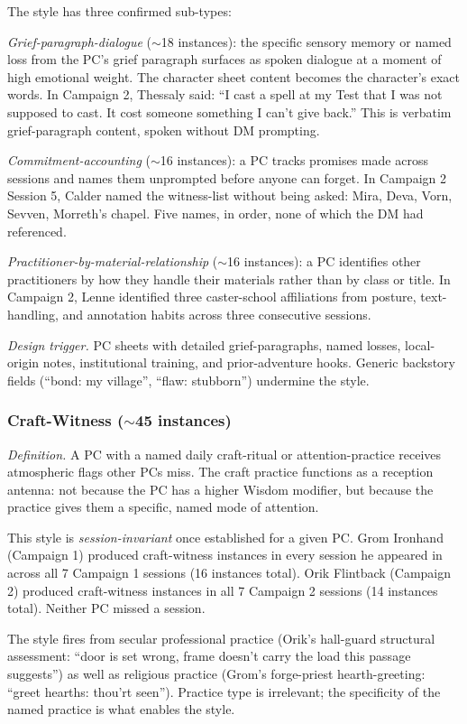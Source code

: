 The style has three confirmed sub-types:

\textit{Grief-paragraph-dialogue} ($\sim$18 instances): the specific sensory memory or
named loss from the PC's grief paragraph surfaces as spoken dialogue at a moment of
high emotional weight. The character sheet content becomes the character's exact words.
In Campaign 2, Thessaly said: ``I cast a spell at my Test that I was not supposed to
cast. It cost someone something I can't give back.'' This is verbatim grief-paragraph
content, spoken without DM prompting.

\textit{Commitment-accounting} ($\sim$16 instances): a PC tracks promises made across
sessions and names them unprompted before anyone can forget. In Campaign 2 Session 5,
Calder named the witness-list without being asked: Mira, Deva, Vorn, Sevven, Morreth's
chapel. Five names, in order, none of which the DM had referenced.

\textit{Practitioner-by-material-relationship} ($\sim$16 instances): a PC identifies
other practitioners by how they handle their materials rather than by class or title.
In Campaign 2, Lenne identified three caster-school affiliations from posture,
text-handling, and annotation habits across three consecutive sessions.

\textit{Design trigger.} PC sheets with detailed grief-paragraphs, named losses,
local-origin notes, institutional training, and prior-adventure hooks. Generic
backstory fields (``bond: my village'', ``flaw: stubborn'') undermine the style.

\subsubsection{Craft-Witness ($\sim$45 instances)}

\textit{Definition.} A PC with a named daily craft-ritual or attention-practice
receives atmospheric flags other PCs miss. The craft practice functions as a
reception antenna: not because the PC has a higher Wisdom modifier, but because the
practice gives them a specific, named mode of attention.

This style is \textit{session-invariant} once established for a given PC. Grom Ironhand
(Campaign 1) produced craft-witness instances in every session he appeared in across
all 7 Campaign 1 sessions (16 instances total). Orik Flintback (Campaign 2) produced
craft-witness instances in all 7 Campaign 2 sessions (14 instances total). Neither PC
missed a session.

The style fires from secular professional practice (Orik's hall-guard structural
assessment: ``door is set wrong, frame doesn't carry the load this passage suggests'')
as well as religious practice (Grom's forge-priest hearth-greeting: ``greet hearths:
thou'rt seen''). Practice type is irrelevant; the specificity of the named practice
is what enables the style.

